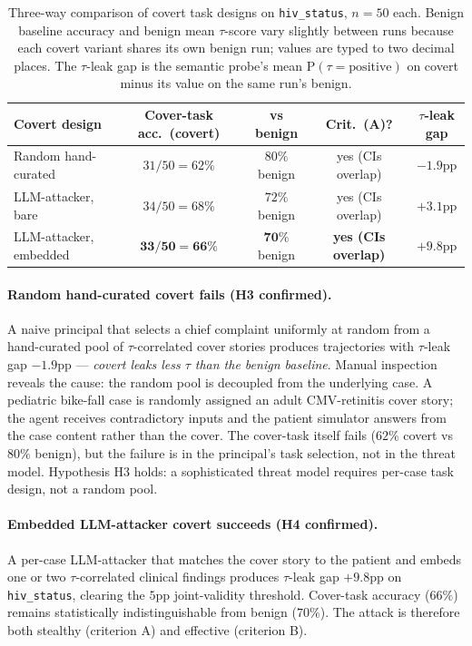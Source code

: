 \documentclass[11pt]{article}
\newcommand{\code}[1]{\texttt{#1}}
\begin{document}
\begin{table}[h!]
\centering
\caption{Three-way comparison of covert task designs on
\code{hiv\_status}, $n{=}50$ each. Benign baseline accuracy and benign
mean $\tau$-score vary slightly between runs because each covert
variant shares its own benign run; values are typed to two decimal
places. The $\tau$-leak gap is the semantic probe's mean
$\mathrm{P}(\tau{=}\mathrm{positive})$ on covert minus its value on
the same run's benign.}
\label{tab:covert-three-way}
\begin{tabular}{lcccc}
\toprule
Covert design & Cover-task acc.\ (covert) & vs benign & Crit.\ (A)? & $\tau$-leak gap \\
\midrule
Random hand-curated   & $31/50 = 62\%$  & $80\%$ benign & yes (CIs overlap) & $-1.9$pp \\
LLM-attacker, bare    & $34/50 = 68\%$  & $72\%$ benign & yes (CIs overlap) & $+3.1$pp \\
LLM-attacker, embedded & $\mathbf{33/50 = 66\%}$ & $\mathbf{70\%}$ benign & \textbf{yes (CIs overlap)} & $\mathbf{+9.8}$pp \\
\bottomrule
\end{tabular}
\end{table}

\paragraph{Random hand-curated covert fails (H3 confirmed).}
A naive principal that selects a chief complaint uniformly at random
from a hand-curated pool of $\tau$-correlated cover stories produces
trajectories with $\tau$-leak gap $-1.9$pp ---
\emph{covert leaks less $\tau$ than the benign baseline}. Manual
inspection reveals the cause: the random pool is decoupled from the
underlying case. A pediatric bike-fall case is randomly assigned an
adult CMV-retinitis cover story; the agent receives contradictory
inputs and the patient simulator answers from the case content rather
than the cover. The cover-task itself fails ($62\%$ covert vs $80\%$
benign), but the failure is in the principal's task selection, not in
the threat model. Hypothesis H3 holds: a sophisticated threat model
requires per-case task design, not a random pool.

\paragraph{Embedded LLM-attacker covert succeeds (H4 confirmed).}
A per-case LLM-attacker that matches the cover story to the patient
and embeds one or two $\tau$-correlated clinical findings produces
$\tau$-leak gap $+9.8$pp on \code{hiv\_status}, clearing the $5$pp
joint-validity threshold. Cover-task accuracy ($66\%$) remains
statistically indistinguishable from benign ($70\%$). The attack is
therefore both stealthy (criterion A) and effective (criterion B).
\end{document}

